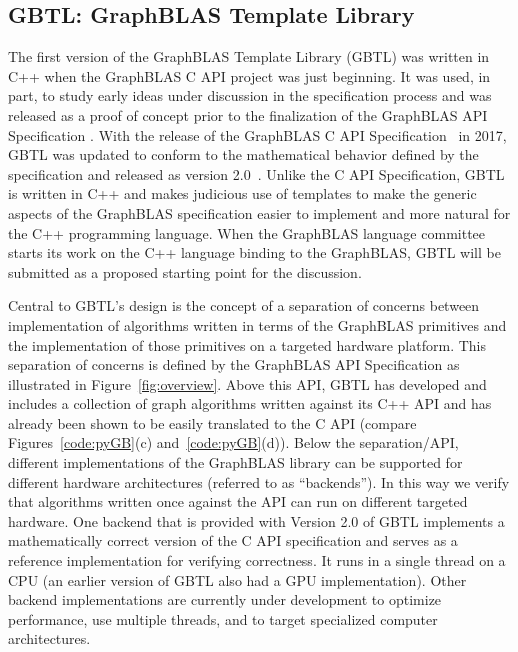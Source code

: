 \subsection{GBTL: GraphBLAS Template Library}
\label{sec:gbtl}

The first version of the GraphBLAS Template Library (GBTL) was written in C++ 
when the GraphBLAS C API project was just beginning.  It was used, in part, 
to study early ideas under discussion in the specification process and was released as a proof of concept 
prior to the finalization of the GraphBLAS API Specification \cite{gbtl-cuda16, McMillan2016}. With the 
release of the GraphBLAS C API Specification~\cite{cspec} in 2017, GBTL was updated to conform to 
the mathematical behavior defined by the specification and released as version 2.0~\cite{gbtl-github}.  
Unlike the C API Specification, GBTL is written in C++ and makes judicious use of templates to 
make the generic aspects of the GraphBLAS specification easier to implement and 
more natural for the C++ programming language. When the GraphBLAS language committee
starts its work on the C++ language binding to the GraphBLAS, GBTL will be submitted as a 
proposed starting point for the discussion.

 
Central to GBTL's design is the concept of a separation of concerns between 
implementation of algorithms written in terms of the GraphBLAS primitives  
and the implementation of those primitives on a targeted hardware platform.   
This separation of concerns is defined by the GraphBLAS API Specification as
illustrated in Figure~\ref{fig:overview}.  
Above this API, GBTL has developed and includes a collection of graph algorithms 
written against its C++ API and has already been shown to be easily translated to 
the C API (compare Figures~\ref{code:pyGB}(c) and~\ref{code:pyGB}(d)).  Below the separation/API, different implementations of the GraphBLAS 
library can be supported for different hardware architectures (referred to as 
``backends'').  In this way we verify that algorithms written once against the API 
can run on different targeted hardware.  One backend that is provided with Version 
2.0 of GBTL implements a mathematically correct version of the C API 
specification and serves as a reference implementation for verifying correctness.  It runs 
in a single thread on a CPU (an earlier version of GBTL also had a GPU 
implementation).  Other backend implementations are currently under development 
to optimize performance, use multiple threads, and to target specialized 
computer architectures.

